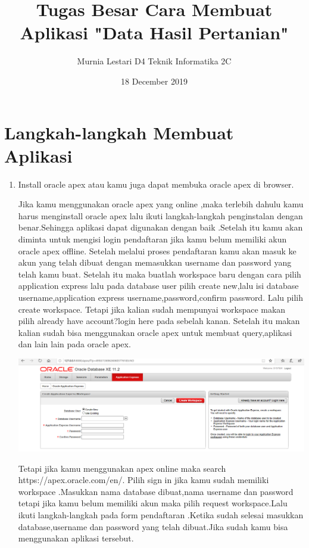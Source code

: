 \documentclass{article}
\title{Tugas Besar Cara Membuat Aplikasi "Data Hasil Pertanian"}
\author{Murnia Lestari D4 Teknik Informatika 2C}
\date{18 December 2019}
\begin{document}
\maketitle

\section{Langkah-langkah Membuat Aplikasi}
\begin{enumerate}
    \item Install oracle apex atau kamu juga dapat membuka oracle apex di browser.
    \par Jika kamu menggunakan oracle apex yang online ,maka terlebih dahulu kamu harus menginstall oracle apex lalu ikuti langkah-langkah penginstalan dengan benar.Sehingga aplikasi dapat digunakan dengan baik .Setelah itu kamu akan diminta untuk mengisi login pendaftaran  jika kamu belum memiliki akun oracle apex offline. Setelah melalui proses pendaftaran kamu akan masuk ke akun yang telah dibuat dengan memasukkan username dan password yang telah kamu buat. Setelah itu maka buatlah workspace baru dengan cara pilih application express lalu pada database user  pilih create new,lalu isi database username,application express username,password,confirm password. Lalu pilih create workspace. Tetapi jika kalian sudah mempunyai workspace makan pilih already have account?login here pada sebelah kanan. Setelah itu makan kalian sudah bisa menggunakan oracle apex untuk membuat query,aplikasi dan lain lain pada oracle apex.
    \begin{center}
              \includegraphics[width=.8\textwidth]{figure/2.PNG}
        \end{center}
    \par Tetapi  jika kamu menggunakan apex online maka search  
    https://apex.oracle.com/en/. Pilih sign in jika kamu sudah memiliki workspace .Masukkan nama database dibuat,nama username dan password tetapi jika kamu belum memiliki akun maka pilih request workspace.Lalu  ikuti langkah-langkah pada  form pendaftaran .Ketika sudah selesai masukkan database,username dan password yang telah dibuat.Jika sudah kamu bisa menggunakan aplikasi tersebut.

\end{enumerate}
\end{document}
